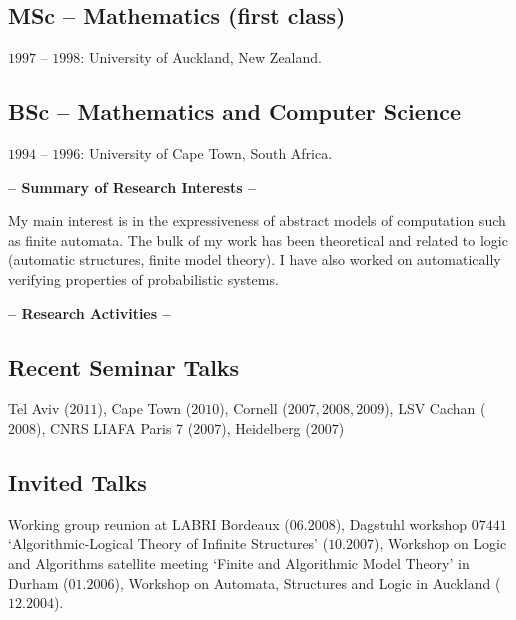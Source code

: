\documentclass[a4paper]{article}
\def\tit#1{\medskip \begin{center}  {\Large {\bf -- #1 -- }} \end{center}}
\begin{document}
\subsection*{{MSc -- Mathematics (first class)}}
{$1997$ -- $1998$: University of Auckland, New Zealand.}

\subsection*{BSc -- Mathematics and Computer Science}
{$1994$ -- $1996$: University of Cape Town, South Africa.} 

\tit{Summary of Research Interests}

My main interest is in the expressiveness of abstract models of computation such as
finite automata. The bulk of my work has been theoretical and related to logic (automatic structures,
finite model theory). I have also worked on  automatically verifying properties of probabilistic systems.

\tit{Research Activities}

\subsection*{Recent Seminar Talks} Tel Aviv ($2011$), Cape Town ($2010$), Cornell ($2007,2008,2009$), LSV Cachan ($2008$), CNRS LIAFA Paris 7 ($2007$), Heidelberg ($2007$)\\

\subsection*{Invited Talks}
Working group reunion at LABRI Bordeaux ($06.2008$), Dagstuhl workshop $07441$ `Algorithmic-Logical Theory of Infinite Structures' ($10.2007$), Workshop on Logic and Algorithms
satellite meeting `Finite and Algorithmic Model Theory' in Durham ($01.2006$), Workshop on Automata, Structures and Logic in Auckland ($12.2004$).
\end{document}

